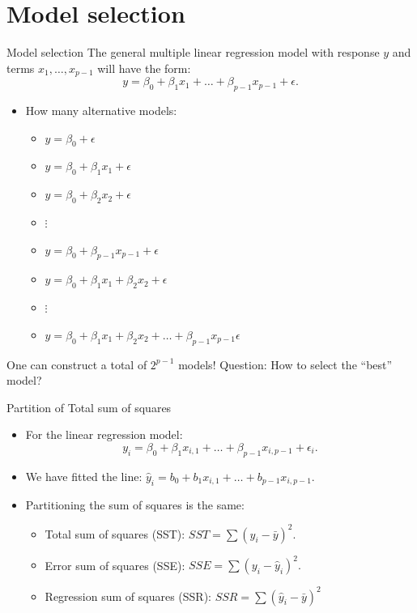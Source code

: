 \documentclass[
  ignorenonframetext,
]{beamer}
\providecommand{\tightlist}{%
  \setlength{\itemsep}{0pt}\setlength{\parskip}{0pt}}
\begin{document}
\section{Model selection}\label{model-selection}

\begin{frame}{Model selection}
\label{model-selection-1}
The general multiple linear regression model with response \(y\) and
terms \(x_1, \ldots, x_{p-1}\) will have the form:
\[y=\beta_0+\beta_1x_1+\ldots + \beta_{p-1}x_{p-1}+\epsilon.\]

\begin{itemize}
\item
  How many alternative models:

  \begin{itemize}
  \tightlist
  \item
    \(y=\beta_0+\epsilon\)
  \item
    \(y=\beta_0+\beta_1x_1+\epsilon\)
  \item
    \(y=\beta_0+\beta_2x_2+\epsilon\)
  \item
    \(\vdots\)
  \item
    \(y=\beta_0+\beta_{p-1}x_{p-1}+\epsilon\)
  \item
    \(y=\beta_0+\beta_1x_1+\beta_2x_2+\epsilon\)
  \item
    \(\vdots\)
  \item
    \(y=\beta_0+\beta_1x_1+\beta_2x_2+\ldots+\beta_{p-1}x_{p-1}\epsilon\)
  \end{itemize}
\end{itemize}

One can construct a total of \(2^{p-1}\) models! Question: How to select
the ``best'' model?
\end{frame}

\begin{frame}{Partition of Total sum of squares}
\label{partition-of-total-sum-of-squares-1}
\begin{itemize}
\item
  For the linear regression model:
  \[y_i=\beta_0+\beta_1x_{i,1}+\ldots + \beta_{p-1}x_{i,p-1}+\epsilon_i.\]
\item
  We have fitted the line:
  \(\hat{y}_i=b_0+b_1x_{i,1}+\ldots + b_{p-1}x_{i,p-1}.\)
\item
  Partitioning the sum of squares is the same:

  \begin{itemize}
  \item
    Total sum of squares (SST): \(SST=\sum(y_i-\bar{y})^2.\)
  \item
    Error sum of squares (SSE): \(SSE=\sum (y_i-\hat{y}_i)^2.\)
  \item
    Regression sum of squares (SSR): \(SSR=\sum (\hat{y}_i-\bar{y})^2\)
  \end{itemize}
\end{itemize}
\end{frame}
\end{document}
